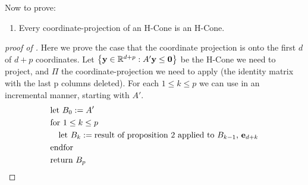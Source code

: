 Now to prove:
\begin{enumerate}
	\item[\Vproj] Every coordinate-projection of an H-Cone is an H-Cone.
\end{enumerate}

\begin{proof}[proof of \Vproj]
	Here we prove the case that the coordinate projection is onto the first $d$ of $d+p$ coordinates.  Let $\left\{\mathbf{y}\in\mathbb{R}^{d+p}:A'\mathbf{y} \leq \mathbf{0}\right\}$ be the H-Cone we need to project, and $\Pi$ the coordinate-projection we need to apply (the identity matrix with the last p columns deleted).  For each $1 \leq k \leq p$ we can use  in an incremental manner, starting with $A'$.
	\begin{align*}
		 & \text{let } B_0 := A'                                        \\
		 & \text{for } 1 \leq k \leq p                                  \\
		 & \quad \text{let } B_k :=
		\text{result of proposition 2 applied to $B_{k-1}$, $\mathbf{e}_{d+k}$} \\
		 & \text{endfor}                                                \\
		 & \text{return } B_p
	\end{align*}


\end{proof}
